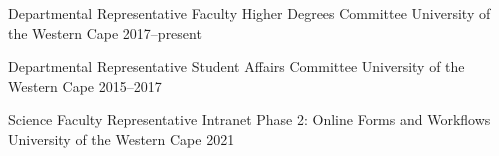 


\begin{cvactivities}


\cvactivity
{Departmental Representative} %
{Faculty Higher Degrees Committee} %
{University of the Western Cape} %
{2017--present} %
    

\cvactivity
{Departmental Representative} %
{Student Affairs Committee} %
{University of the Western Cape} %
{2015--2017} %


\cvactivity
{Science Faculty Representative} %
{Intranet Phase 2: Online Forms and Workflows} %
{University of the Western Cape} %
{2021} %


\end{cvactivities}